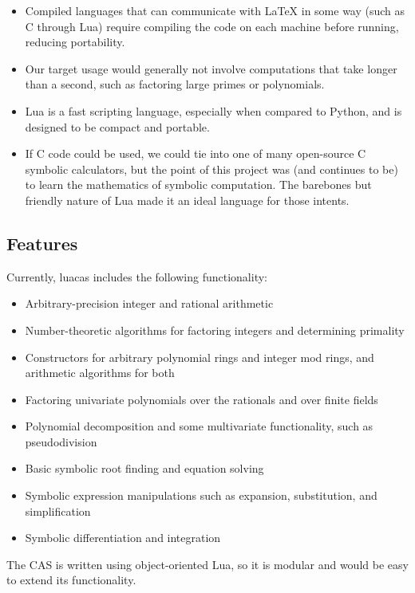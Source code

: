 \documentclass{article}
\begin{document}
\begin{itemize}
    \item Compiled languages that can communicate with \LaTeX{} in some way (such as C through Lua) require compiling the code on each machine before running, reducing portability.
    \item Our target usage would generally not involve computations that take longer than a second, such as factoring large primes or polynomials.
    \item Lua is a fast scripting language, especially when compared to Python, and is designed to be compact and portable.
    \item If C code could be used, we could tie into one of many open-source C symbolic calculators, but the point of this project was (and continues to be) to learn the mathematics of symbolic computation. The barebones but friendly nature of Lua made it an ideal language for those intents.
\end{itemize}

\subsection{Features}

Currently, {\ttfamily luacas} includes the following functionality:

\begin{itemize}
    \item Arbitrary-precision integer and rational arithmetic
    \item Number-theoretic algorithms for factoring integers and determining primality
    \item Constructors for arbitrary polynomial rings and integer mod rings, and arithmetic algorithms for both
    \item Factoring univariate polynomials over the rationals and over finite fields
    \item Polynomial decomposition and some multivariate functionality, such as pseudodivision
    \item Basic symbolic root finding and equation solving
    \item Symbolic expression manipulations such as expansion, substitution, and simplification
    \item Symbolic differentiation and integration
\end{itemize}

The CAS is written using object-oriented Lua, so it is modular and would be easy to extend its functionality.
\end{document}
